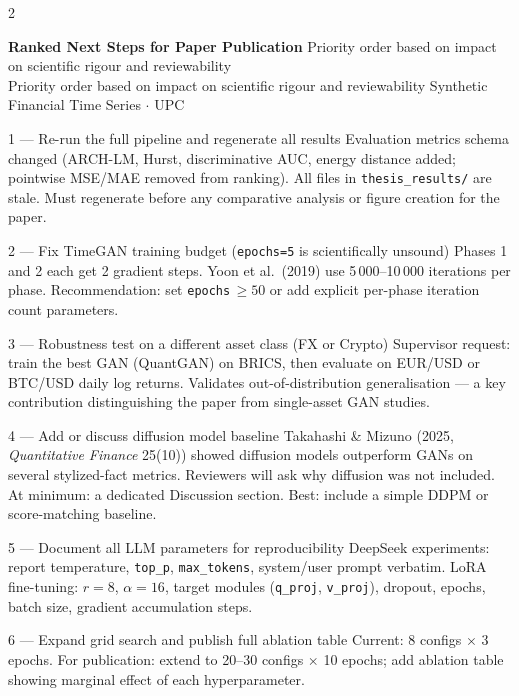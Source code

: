 \documentclass[10pt]{article}
\newcommand{\pagehead}[2]{%
  \begin{tcolorbox}[enhanced,arc=0pt,outer arc=0pt,boxrule=0pt,
    colback=Navy,colframe=Navy,
    top=5pt,bottom=5pt,left=8pt,right=8pt,
    before skip=0pt,after skip=10pt]
  {\color{white}\large\bfseries #1}%
  \ifx\relax#2\relax\else\\[1pt]{\color{blue!30!white}\small #2}\fi
  \hfill{\color{blue!20!white}\footnotesize Synthetic Financial Time Series $\cdot$ UPC}
  \end{tcolorbox}}
\begin{document}
\begin{multicols}{2}
\end{multicols}

\clearpage

\pagehead{Ranked Next Steps for Paper Publication}
         {Priority order based on impact on scientific rigour and reviewability}

\vspace{4pt}
%
  {1 --- Re-run the full pipeline and regenerate all results}%
  {Evaluation metrics schema changed (ARCH-LM, Hurst, discriminative AUC, energy distance added; pointwise MSE/MAE removed from ranking). All files in \texttt{thesis\_results/} are stale. Must regenerate before any comparative analysis or figure creation for the paper.}

%
  {2 --- Fix TimeGAN training budget (\texttt{epochs=5} is scientifically unsound)}%
  {Phases 1 and 2 each get 2 gradient steps. Yoon et al.\ (2019) use 5\,000--10\,000 iterations per phase. Recommendation: set \texttt{epochs}\,$\geq 50$ or add explicit per-phase iteration count parameters.}

%
  {3 --- Robustness test on a different asset class (FX or Crypto)}%
  {Supervisor request: train the best GAN (QuantGAN) on BRICS, then evaluate on EUR/USD or BTC/USD daily log returns. Validates out-of-distribution generalisation --- a key contribution distinguishing the paper from single-asset GAN studies.}

%
  {4 --- Add or discuss diffusion model baseline}%
  {Takahashi \& Mizuno (2025, \textit{Quantitative Finance} 25(10)) showed diffusion models outperform GANs on several stylized-fact metrics. Reviewers will ask why diffusion was not included. At minimum: a dedicated Discussion section. Best: include a simple DDPM or score-matching baseline.}

%
  {5 --- Document all LLM parameters for reproducibility}%
  {DeepSeek experiments: report temperature, \texttt{top\_p}, \texttt{max\_tokens}, system/user prompt verbatim. LoRA fine-tuning: $r=8$, $\alpha=16$, target modules (\texttt{q\_proj}, \texttt{v\_proj}), dropout, epochs, batch size, gradient accumulation steps.}

%
  {6 --- Expand grid search and publish full ablation table}%
  {Current: 8 configs $\times$ 3 epochs. For publication: extend to 20--30 configs $\times$ 10 epochs; add ablation table showing marginal effect of each hyperparameter.}
\end{document}
